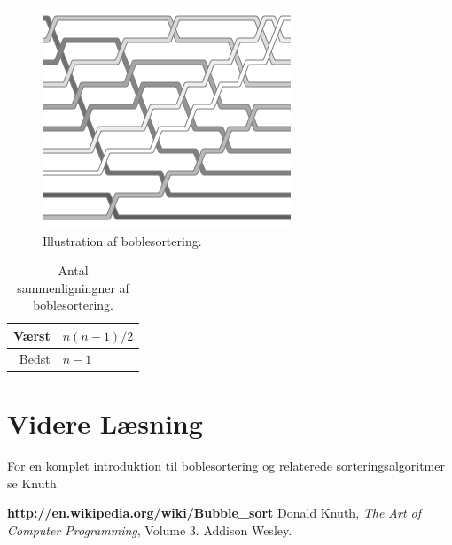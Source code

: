 \documentclass{article}
\begin{document}
	\begin{figure}[h]
		\centering
		\includegraphics[scale=0.5]{Images/BubbleSort.png}
		\caption{Illustration af boblesortering.}
		\label{figur1}
	\end{figure}

	\begin{table}[h]
		\centering
		\begin{tabular}{|r|l|}
			\hline
			Værst & $n(n-1)/2$ \\
			\hline
			Bedst & $n-1$ \\
			\hline
		\end{tabular}
		\caption{Antal sammenligningner af boblesortering.}
		\label{tabel1}
	\end{table}

\section{Videre Læsning}
	For en komplet introduktion til boblesortering og relaterede sorteringsalgoritmer se Knuth~\cite{knuth}


\begin{thebibliography}{99}
		\textbf{http://en.wikipedia.org/wiki/Bubble\_sort}
		Donald Knuth, \textit{The Art of Computer Programming}, Volume 3. Addison Wesley.
\end{thebibliography}
\end{document}
